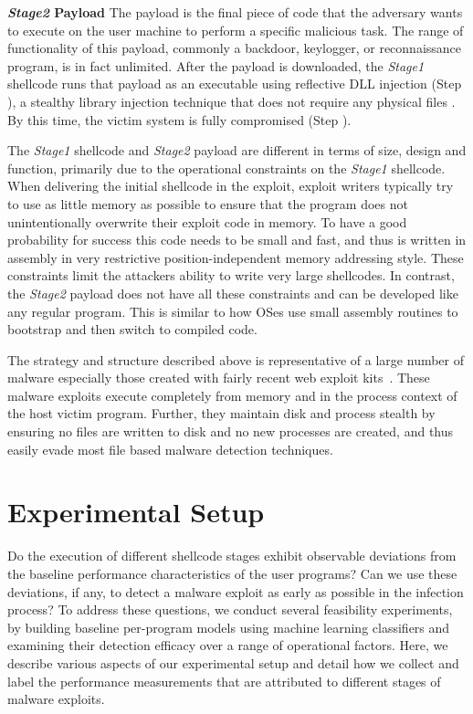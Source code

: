 \documentclass{acm_proc_article-sp}
\begin{document}
\textbf{\textit{Stage2} Payload} \space\space The payload is the
final piece of code that the adversary wants to execute on the user
machine to perform a specific malicious task.  The range of
functionality of this payload, commonly a backdoor, keylogger, or
reconnaissance program, is in fact unlimited.  After the payload is
downloaded, the \textit{Stage1} shellcode runs that payload as an
executable using reflective DLL injection (Step
\raisebox{.1pt}{\textcircled{\raisebox{-.5pt} {6}}}), a stealthy
library injection technique that does not require any physical files
\cite{Fewer:2008}.  By this time, the victim system is fully
compromised (Step \raisebox{.1pt}{\textcircled{\raisebox{-.5pt}
{7}}}).

The \textit{Stage1} shellcode and \textit{Stage2} payload are
different in terms of size, design and function, primarily due to
the operational constraints on the \textit{Stage1} shellcode. When
delivering the initial shellcode in the exploit, exploit writers
typically try to use as little memory as possible to ensure that
the program does not unintentionally overwrite their exploit code
in memory. To have a good probability for success this code needs
to be small and fast, and thus is written in assembly in very
restrictive position-independent memory addressing style. These
constraints limit the attackers ability to write very large shellcodes.
In contrast, the \textit{Stage2} payload does not have all these
constraints and can be developed like any regular program.  This
is similar to how OSes use small assembly routines to bootstrap and
then switch to compiled code.

The strategy and structure described above is representative of a
large number of malware especially those created with fairly recent
web exploit kits~\cite{TM:2012}.  These malware exploits execute
completely from memory and in the process context of the host victim
program.  Further, they maintain disk and process stealth by ensuring
no files are written to disk and no new processes are created, and
thus easily evade most file based malware detection techniques.


\section{Experimental Setup}
\label{sec:experiment}
Do the execution of different shellcode stages exhibit observable deviations from the baseline performance characteristics of the user programs? Can we use these deviations, if any, to detect a malware exploit as early as possible in the infection process? To address these questions, we conduct several feasibility experiments, by building baseline per-program models using machine learning classifiers and examining their detection efficacy over a range of operational factors. Here, we describe various aspects of our experimental setup and detail how we collect and label the performance measurements that are attributed to different stages of malware exploits.
\end{document}
